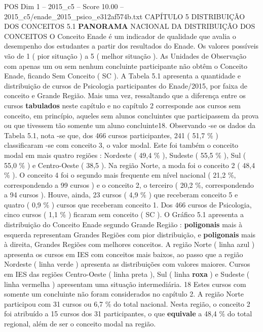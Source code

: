 \begin{textsample}{POS Dim 1 – 2015\_c5 – Score 10.00 – 2015\_c5/enade\_2015\_psico\_e312af574b.txt}  \label{ex:f1_pos_094}
CAPÍTULO 5 DISTRIBUIÇÃO DOS CONCEITOS 5.1 \textbf{PANORAMA} NACIONAL DA DISTRIBUIÇÃO DOS CONCEITOS O Conceito Enade é um indicador de qualidade que avalia o desempenho dos estudantes a partir dos resultados do Enade.
Os valores possíveis vão de 1 ( pior situação ) a 5 ( melhor situação ).
As Unidades de Observação com apenas um ou sem nenhum concluinte participante não obtêm o Conceito Enade, ficando Sem Conceito ( SC ).
A Tabela 5.1 apresenta a quantidade e distribuição de cursos de Psicologia participantes do Enade/2015, por faixa de conceito e Grande Região.
Mais uma vez, ressaltando que a diferença entre os cursos \textbf{tabulados} neste capítulo e no capítulo 2 corresponde aos cursos sem conceito, em princípio, aqueles sem alunos concluintes que participassem da prova ou que tivessem tão somente um aluno concluinte18.
Observando -se os dados da Tabela 5.1, nota -se que, dos 466 cursos participantes, 241 ( 51,7 \% ) classificaram -se com conceito 3, o valor modal.
Este foi também o conceito modal em mais quatro regiões : Nordeste ( 49,4 \% ), Sudeste ( 55,5 \% ), Sul ( 55,0 \% ) e Centro-Oeste ( 38,5 ).
Na região Norte, a moda foi o conceito 2 ( 48,4 \% ).
O conceito 4 foi o segundo mais frequente em nível nacional ( 21,2 \%, correspondendo a 99 cursos ) e o conceito 2, o terceiro ( 20,2 \%, correspondendo a 94 cursos ).
Houve, ainda, 23 cursos ( 4,9 \% ) que receberam conceito 5 e quatro ( 0,9 \% ) cursos que receberam conceito 1.
Dos 466 cursos de Psicologia, cinco cursos ( 1,1 \% ) ficaram sem conceito ( SC ).
O Gráfico 5.1 apresenta a distribuição do Conceito Enade segundo Grande Região : \textbf{poligonais} mais à esquerda representam Grandes Regiões com pior distribuição, e \textbf{poligonais} mais à direita, Grandes Regiões com melhores conceitos.
A região Norte ( linha azul ) apresenta os cursos em IES com conceitos mais baixos, ao passo que a região Nordeste ( linha verde ) apresenta as distribuições com valores maiores.
Cursos em IES das regiões Centro-Oeste ( linha preta ), Sul ( linha \textbf{roxa} ) e Sudeste ( linha vermelha ) apresentam uma situação intermediária. 18 Estes cursos com somente um concluinte não foram considerados no capítulo 2.
A região Norte participou com 31 cursos ou 6,7 \% do total nacional.
Nesta região, o conceito 2 foi atribuído a 15 cursos dos 31 participantes, o que \textbf{equivale} a 48,4 \% do total regional, além de ser o conceito modal na região.

\end{textsample}
